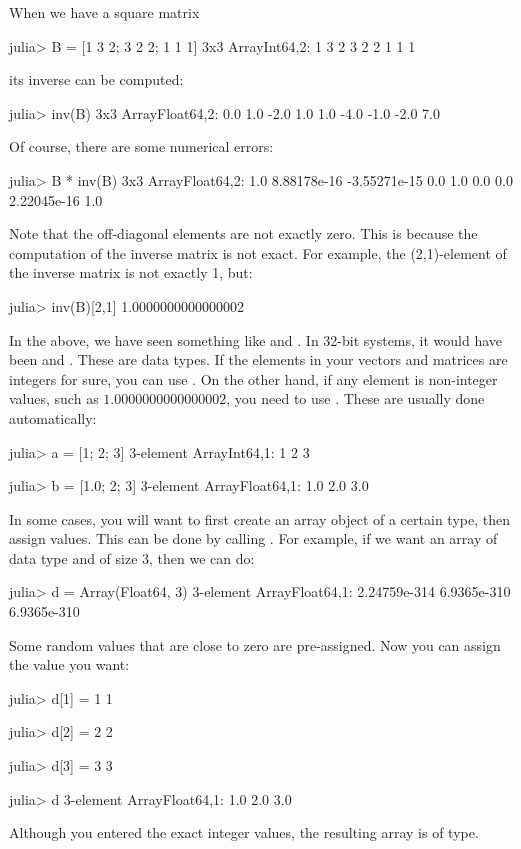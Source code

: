 When we have a square matrix
\begin{code}
julia> B = [1 3 2; 3 2 2; 1 1 1]
3x3 Array{Int64,2}:
 1  3  2
 3  2  2
 1  1  1
\end{code}
\noindent its inverse can be computed:
\begin{code}
julia> inv(B)
3x3 Array{Float64,2}:
  0.0   1.0  -2.0
  1.0   1.0  -4.0
 -1.0  -2.0   7.0
\end{code}
\noindent Of course, there are some numerical errors:
\begin{code}
julia> B * inv(B)
3x3 Array{Float64,2}:
 1.0  8.88178e-16  -3.55271e-15
 0.0  1.0           0.0
 0.0  2.22045e-16   1.0
\end{code}
\noindent Note that the off-diagonal elements are not exactly zero. This is because the computation of the inverse matrix is not exact. For example, the (2,1)-element of the inverse matrix is not exactly 1, but:
\begin{code}
julia> inv(B)[2,1]
1.0000000000000002
\end{code}




In the above, we have seen something like  and . In 32-bit systems, it would have been  and . These are data types. If the elements in your vectors and matrices are integers for sure, you can use . On the other hand, if any element is non-integer values, such as $1.0000000000000002$, you need to use . These are usually done automatically:
\begin{code}
julia> a = [1; 2; 3]
3-element Array{Int64,1}:
 1
 2
 3

julia> b = [1.0; 2; 3]
3-element Array{Float64,1}:
 1.0
 2.0
 3.0
\end{code}

In some cases, you will want to first create an array object of a certain type, then assign values. This can be done by calling . For example, if we want an array of  data type and of size 3, then we can do:
\begin{code}
julia> d = Array(Float64, 3)
3-element Array{Float64,1}:
 2.24759e-314
 6.9365e-310
 6.9365e-310
\end{code}
\noindent Some random values that are close to zero are pre-assigned. Now you can assign the value you want:
\begin{code}
julia> d[1] = 1
1

julia> d[2] = 2
2

julia> d[3] = 3
3

julia> d
3-element Array{Float64,1}:
 1.0
 2.0
 3.0
\end{code}
\noindent Although you entered the exact integer values, the resulting array is of  type.

